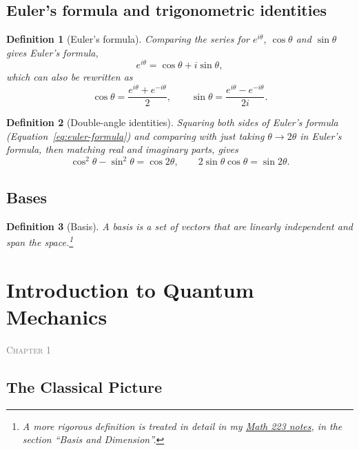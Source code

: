 \documentclass{article}
\newtheorem{definition}{Definition}
\newcommand{\chapterstart}[1]{\noindent\hfill{\small\scshape\textcolor{gray}{Chapter #1}}\par}
\begin{document}
\subsection{Euler's formula and trigonometric identities}
\begin{definition}[Euler's formula]
    Comparing the series for $e^{i\theta}$, $\cos\theta$ and $\sin\theta$ gives Euler's formula,
    \begin{equation}
        \label{eq:euler-formula}
        e^{i\theta} = \cos\theta + i\sin\theta,
    \end{equation}
    which can also be rewritten as
    \begin{equation*}
        \cos\theta = \frac{e^{i\theta}+e^{-i\theta}}{2}, \qquad \sin\theta = \frac{e^{i\theta}-e^{-i\theta}}{2i}.
    \end{equation*}
\end{definition}
\begin{definition}[Double-angle identities]
    Squaring both sides of Euler's formula (Equation~\eqref{eq:euler-formula}) and comparing with just taking $\theta \to 2\theta$ in Euler's formula, then matching real and imaginary parts, gives
    \begin{equation}
        \cos^2\theta - \sin^2\theta = \cos 2\theta, \qquad 2\sin\theta\cos\theta = \sin 2\theta.
    \end{equation}
\end{definition}

\subsection{Bases}
\begin{definition}[Basis]
    A basis is a set of vectors that are linearly independent and span the space.\footnote{A more rigorous definition is treated in detail in my \href{https://github.com/williamr-yc7/stem-undergrad-notes/blob/1479320110013b60a8c4eddb42c7916cda1b2e6e/Winter\%202026/Math223.pdf}{Math 223 notes}, in the section ``Basis and Dimension''.}
\end{definition}


\section{Introduction to Quantum Mechanics}
\chapterstart{1}
\subsection{The Classical Picture}
\end{document}
